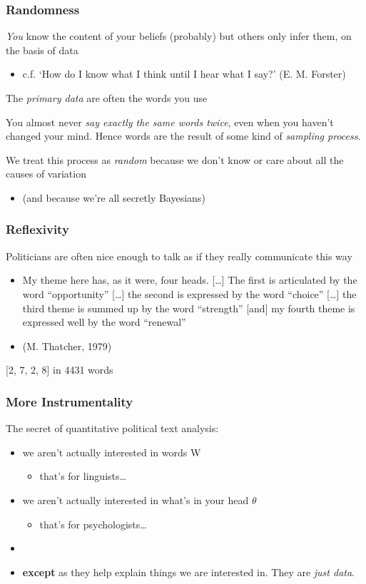\documentclass[11pt,compress,professionalfonts]{beamer}
\newcommand{\ita}{\begin{itemize}}
\newcommand{\itm}{\item[]}
\newcommand{\itz}{\end{itemize}}
\begin{document}
\begin{frame}[t]\frametitle{Randomness}

\textit{You} know the content of your beliefs (probably)
but others only infer them, on the basis of data
\ita
\itm c.f. `How do I know what I think until I hear what I say?' (E. M. Forster)
\itz
The \textsl{primary data} are often the words you use

You almost never \textit{say exactly the same words twice}, even when you haven't changed your mind.  Hence words are the result of some kind of \textsl{sampling process}.

We treat this process as \textsl{random} because we don't know or care about all the causes of variation
\ita
\itm (and because we're all secretly Bayesians)
\itz

%
%
%
%

\end{frame}
\begin{frame}[t]\frametitle{Reflexivity}

Politicians are often nice enough to talk as if they really communicate this way

\ita
\itm My theme here has, as it were, four heads. [\ldots] The first is articulated by the word ``opportunity'' [\ldots] the second is expressed by the word ``choice'' [\ldots] the third theme is summed up by the word ``strength'' [and] my fourth theme is expressed well by the word ``renewal''
\itm (M. Thatcher, 1979)
\itz

[2, 7, 2, 8] in 4431 words

\end{frame}
\begin{frame}[t]\frametitle{More Instrumentality}

The secret of quantitative political text analysis:
\ita
\itm we aren't actually interested in words W
\ita
\itm that's for linguists\ldots
\itz
\itm we aren't actually interested in what's in your head $\theta$
\ita
\itm that's for psychologists\ldots
\itz
\itm
\itm \textbf{except} as they help explain things we are interested in.  They are \textit{just data}.
\itz


%
%
%

\end{frame}
\end{document}
